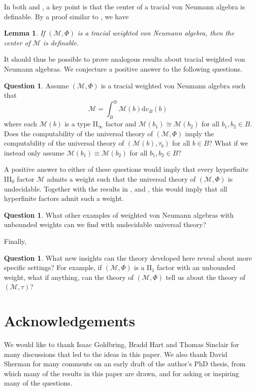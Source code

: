 \documentclass[12pt]{amsart}
\newtheorem{lem}[thm]{Lemma}
\theoremstyle{definition}
\newtheorem{question}[thm]{Question}
\def\cal{\mathcal}
\begin{document}
In both \cite{FG} and \cite{GaoJekel}, a key point is that the center of a tracial von Neumann algebra is definable.  By a proof similar to \cite[Corollary 4.3]{FHS1}, we have

\begin{lem}
    If $(\cal M, \Phi)$ is a tracial weighted von Neumann algebra, then the center of $\cal M$ is definable.
\end{lem}

It should thus be possible to prove analogous results about tracial weighted von Neumann algebras. We conjecture a positive answer to the following questions.

\begin{question}
    Assume $(\cal M, \Phi)$ is a tracial weighted von Neumann algebra such that
    \[
    \cal M = \int_{B}^{\oplus} \cal M(b) \mathrm{d}v_{B}(b)
    \]
    where each $\cal M(b)$ is a type II$_\infty$ factor and $\cal M(b_1) \cong \cal M(b_2)$ for all $b_1, b_2 \in B$.  Does the computability of the universal theory of $(\cal M, \Phi)$ imply the computability of the universal theory of $(\cal M(b), \tau_b)$ for all $b \in B$?  What if we instead only assume $\cal M(b_1) \equiv \cal M(b_2)$ for all $b_1, b_2 \in B$?
\end{question}

A positive answer to either of these questions would imply that every hyperfinite III$_0$ factor $\cal M$ admits a weight such that the universal theory of $(\cal M, \Phi)$ is undecidable.  Together with the results in \cite{GH2}, \cite{AGH} and \cite{Connes76}, this would imply that all hyperfinite factors admit such a weight.

\begin{question}
    What other examples of weighted von Neumann algebras with unbounded weights can we find with undecidable universal theory?
\end{question}

Finally,

\begin{question}
    What new insights can the theory developed here reveal about more specific settings? For example, if $(\cal M, \Phi)$ is a II$_1$ factor with an unbounded weight, what if anything, can the theory of $(\cal M, \Phi)$ tell us about the theory of $(\cal M, \tau)$?
\end{question}

\section*{Acknowledgements} We would like to thank Isaac Goldbring, Bradd Hart and Thomas Sinclair for many discussions that led to the ideas in this paper.  We also thank David Sherman for many comments on an early draft of the author's PhD thesis, from which many of the results in this paper are drawn, and for asking or inspiring many of the questions.
\end{document}
